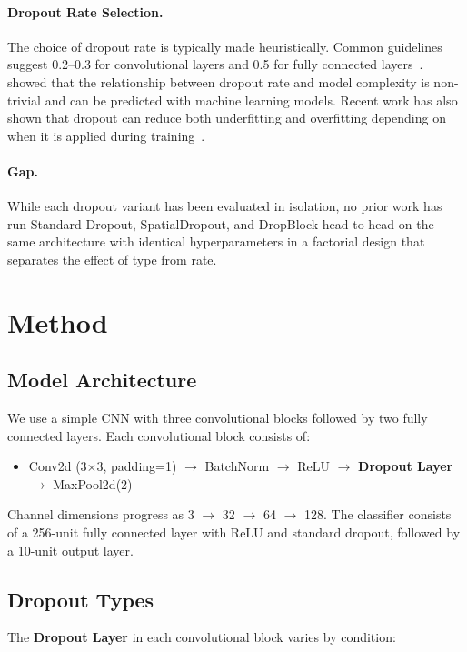\documentclass[11pt]{article}
\begin{document}
\paragraph{Dropout Rate Selection.}
The choice of dropout rate is typically made heuristically. Common guidelines suggest 0.2--0.3 for convolutional layers and 0.5 for fully connected layers~\citep{dropoutreview2023}. \citet{dropoutcomplexity2021} showed that the relationship between dropout rate and model complexity is non-trivial and can be predicted with machine learning models. Recent work has also shown that dropout can reduce both underfitting and overfitting depending on when it is applied during training~\citep{dropoutunderfitting2023}.

\paragraph{Gap.}
While each dropout variant has been evaluated in isolation, no prior work has run Standard Dropout, SpatialDropout, and DropBlock head-to-head on the same architecture with identical hyperparameters in a factorial design that separates the effect of type from rate.

\section{Method}

\subsection{Model Architecture}

We use a simple CNN with three convolutional blocks followed by two fully connected layers. Each convolutional block consists of:
\begin{itemize}
    \item Conv2d (3$\times$3, padding=1) $\rightarrow$ BatchNorm $\rightarrow$ ReLU $\rightarrow$ \textbf{Dropout Layer} $\rightarrow$ MaxPool2d(2)
\end{itemize}
Channel dimensions progress as 3 $\rightarrow$ 32 $\rightarrow$ 64 $\rightarrow$ 128. The classifier consists of a 256-unit fully connected layer with ReLU and standard dropout, followed by a 10-unit output layer.

\subsection{Dropout Types}

The \textbf{Dropout Layer} in each convolutional block varies by condition:
\end{document}
